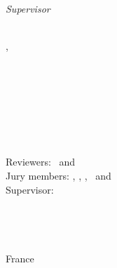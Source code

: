 \begin{titlepage}
    \begin{minipage}[t]{.21\textwidth}
        \raggedleft
        {\small \textit{Supervisor}}
    \end{minipage}
    \hspace*{15pt}
    \begin{minipage}[t]{.7\textwidth}
        {\large \thesisFirstSupervisor}\\
        {\small \thesisUniversityTitle},
        {\small \thesisUniversity}
    \end{minipage} \\[15mm]

    \thesisDate \\

\end{titlepage}


\hfill
\vfill
{\small
\textbf{\thesisName} \\
\textit{\thesisTitle} \\
\thesisSubject\\
\thesisDate \\
Reviewers: \thesisFirstReviewer\ and \thesisSecondReviewer \\
Jury members: \thesisPresident, \thesisFirstReviewer, \thesisSecondReviewer, \thesisExaminator\ and \thesisFirstSupervisor\\
Supervisor: \thesisFirstSupervisor\\[1.5em]
\textbf{\thesisUniversity} \\
\thesisUniversityDepartment \\
\thesisUniversityStreetAddress \\
\thesisUniversityPostalCode\ \thesisUniversityCity\\
France
}
